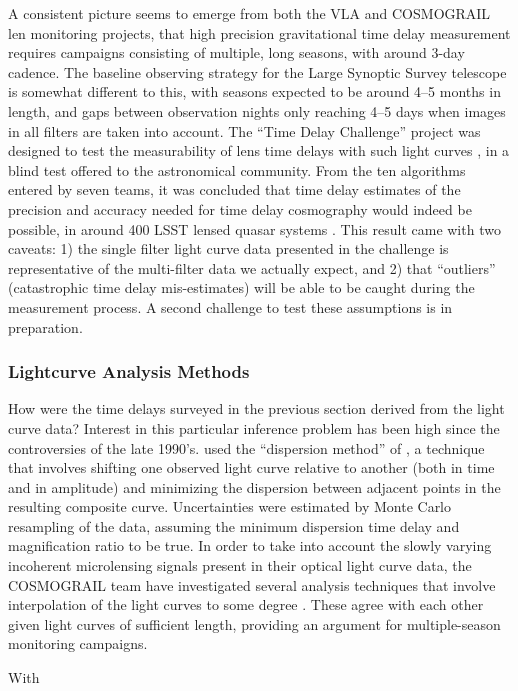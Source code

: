 A consistent picture seems to emerge from  both the VLA and COSMOGRAIL
len monitoring projects, that high precision  gravitational time delay
measurement requires campaigns consisting of  multiple, long seasons,
with around 3-day cadence. The baseline observing strategy for the Large
Synoptic Survey telescope is somewhat different to this, with seasons
expected to be  around 4--5 months in length, and gaps between
observation nights only reaching 4--5 days when images in all filters
are taken into account. The ``Time Delay Challenge'' project was
designed to test the measurability of lens time delays with such light
curves \citep{DoblerEtal2013}, in a blind test offered to the
astronomical community. From the ten algorithms entered by seven teams,
it was concluded that time delay estimates of the precision and accuracy
needed for time delay cosmography would indeed be possible, in around
400 LSST lensed quasar systems \citep{LiaoEtal2015}. This result came
with two caveats:  1) the single filter light curve data presented in
the challenge is representative of the  multi-filter data we actually
expect, and 2) that ``outliers'' (catastrophic time delay mis-estimates)
will be able to be caught during the measurement process.  A second
challenge to test these assumptions is in preparation.




\subsubsection{Lightcurve Analysis Methods}



How were the time delays surveyed in the previous section derived from
the light curve data? Interest in this particular inference problem has
been  high since the controversies of the late 1990's. \citet{Fas++99}
used  the ``dispersion method'' of \citet{Pelt++96}, a technique that
involves  shifting one observed light curve relative to another (both in
time and in  amplitude) and minimizing the dispersion between adjacent
points in the  resulting composite curve. Uncertainties were estimated
by Monte Carlo resampling  of the data, assuming the minimum dispersion
time delay and magnification ratio to be true. In order to take into
account the slowly varying incoherent microlensing signals present in
their optical light curve data, the COSMOGRAIL team have  investigated
several analysis techniques that involve interpolation of the light
curves to some degree \citep{TCM13}. These agree with each other given
light curves of sufficient length, providing an argument for
multiple-season monitoring campaigns.

With
